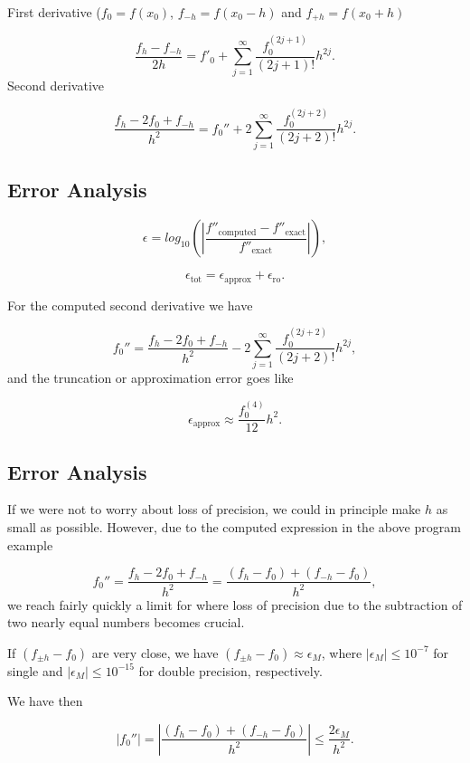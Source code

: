 \documentclass[%
twoside,                 %
final,                   %
10pt]{article}
\newenvironment{block_mdfboxadmon}[1][]{
\begin{block_mdfboxmdframed}[frametitle=#1]
}
{
\end{block_mdfboxmdframed}
}
\begin{document}
\begin{block_mdfboxadmon}
First derivative  ($f_0 = f(x_0)$, $f_{-h}=f(x_0-h)$ and $f_{+h}=f(x_0+h)$

\[
   \frac{f_h-f_{-h}}{2h}=f'_0+\sum_{j=1}^{\infty}\frac{f_0^{(2j+1)}}{(2j+1)!}h^{2j}.
\]
Second derivative

\[
 \frac{ f_h -2f_0 +f_{-h}}{h^2}=f_0''+2\sum_{j=1}^{\infty}\frac{f_0^{(2j+2)}}{(2j+2)!}h^{2j}.
\]
\end{block_mdfboxadmon}



\subsection{Error Analysis}


\begin{block_mdfboxadmon}[]
\[
   \epsilon=log_{10}\left(\left|\frac{f''_{\mbox{computed}}-f''_{\mbox{exact}}}
                 {f''_{\mbox{exact}}}\right|\right),
\]

\[
   \epsilon_{\mbox{tot}}=\epsilon_{\mbox{approx}}+\epsilon_{\mbox{ro}}.
\]

For the computed second derivative  we have

\[
 f_0''=\frac{ f_h -2f_0 +f_{-h}}{h^2}-2\sum_{j=1}^{\infty}\frac{f_0^{(2j+2)}}{(2j+2)!}h^{2j},
\]
and the truncation or approximation error goes like

\[
  \epsilon_{\mbox{approx}}\approx \frac{f_0^{(4)}}{12}h^{2}.
\]
\end{block_mdfboxadmon}



\subsection{Error Analysis}


\begin{block_mdfboxadmon}[]
If we were not to worry about loss of precision, we could in principle
make $h$ as small as possible.
However, due to the computed expression in the above program example

\[
 f_0''=\frac{ f_h -2f_0 +f_{-h}}{h^2}=\frac{ (f_h -f_0) +(f_{-h}-f_0)}{h^2},
\]
we reach fairly quickly a limit for where loss of precision due to the subtraction
of two nearly equal numbers becomes crucial.

If $(f_{\pm h} -f_0)$ are very close, we have
$(f_{\pm h} -f_0)\approx \epsilon_M$, where $|\epsilon_M|\le 10^{-7}$ for single and
$|\epsilon_M|\le 10^{-15}$ for double precision, respectively.

We have then

\[
 \left|f_0''\right|=
 \left|\frac{ (f_h -f_0) +(f_{-h}-f_0)}{h^2}\right|\le \frac{ 2 \epsilon_M}{h^2}.
\]
\end{block_mdfboxadmon}
\end{document}
